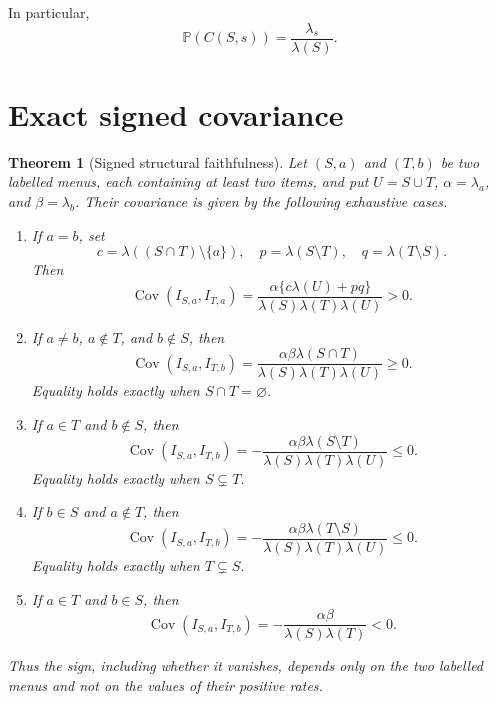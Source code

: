 \documentclass[11pt]{article}
\newtheorem{theorem}{Theorem}[section]
\theoremstyle{definition}
\newcommand{\Pp}{\mathbb{P}}
\newcommand{\Cov}{\operatorname{Cov}}
\newcommand{\1}{\mathbf{1}}
\begin{document}
In particular,
\begin{equation}
\label{eq:marginal}
\Pp(C(S,s))=\frac{\lambda_s}{\lambda(S)}.
\end{equation}

\section{Exact signed covariance}

\begin{theorem}[Signed structural faithfulness]
\label{thm:pair}
Let \((S,a)\) and \((T,b)\) be two labelled menus, each containing at least two items, and put
\(U=S\cup T\), \(\alpha=\lambda_a\), and \(\beta=\lambda_b\). Their covariance is given by the
following exhaustive cases.

\begin{enumerate}
\item If \(a=b\), set
\[
c=\lambda((S\cap T)\setminus\{a\}),\quad
p=\lambda(S\setminus T),\quad
q=\lambda(T\setminus S).
\]
Then
\begin{equation}
\label{eq:same-pivot}
\Cov(I_{S,a},I_{T,a})
=
\frac{\alpha\{c\lambda(U)+pq\}}
     {\lambda(S)\lambda(T)\lambda(U)}
>0.
\end{equation}

\item If \(a\ne b\), \(a\notin T\), and \(b\notin S\), then
\begin{equation}
\label{eq:no-cross}
\Cov(I_{S,a},I_{T,b})
=
\frac{\alpha\beta\lambda(S\cap T)}
     {\lambda(S)\lambda(T)\lambda(U)}
\geq0.
\end{equation}
Equality holds exactly when \(S\cap T=\varnothing\).

\item If \(a\in T\) and \(b\notin S\), then
\begin{equation}
\label{eq:one-cross}
\Cov(I_{S,a},I_{T,b})
=
-\frac{\alpha\beta\lambda(S\setminus T)}
      {\lambda(S)\lambda(T)\lambda(U)}
\leq0.
\end{equation}
Equality holds exactly when \(S\subsetneq T\).

\item If \(b\in S\) and \(a\notin T\), then
\begin{equation}
\label{eq:other-cross}
\Cov(I_{S,a},I_{T,b})
=
-\frac{\alpha\beta\lambda(T\setminus S)}
      {\lambda(S)\lambda(T)\lambda(U)}
\leq0.
\end{equation}
Equality holds exactly when \(T\subsetneq S\).

\item If \(a\in T\) and \(b\in S\), then
\begin{equation}
\label{eq:double-cross}
\Cov(I_{S,a},I_{T,b})
=-\frac{\alpha\beta}{\lambda(S)\lambda(T)}<0.
\end{equation}
\end{enumerate}

Thus the sign, including whether it vanishes, depends only on the two labelled menus and not on the
values of their positive rates.
\end{theorem}
\end{document}

